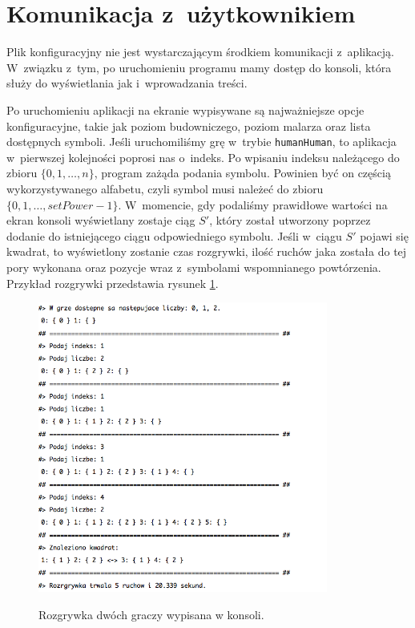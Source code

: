 \documentclass[document]{xmgr}
\begin{document}
\section{Komunikacja z~użytkownikiem}
Plik konfiguracyjny nie jest wystarczającym środkiem komunikacji z~ap\-likacją. W~związku z~tym, po uruchomieniu programu mamy dostęp do konsoli, która służy do wyświetlania jak i~wprowadzania treści.

Po uruchomieniu aplikacji na ekranie wypisywane są najważniejsze op\-cje konfiguracyjne, takie jak poziom budowniczego, poziom malarza oraz lista dostępnych symboli. Jeśli uruchomiliśmy grę w~trybie \texttt{humanHuman}, to aplikacja w~pierwszej kolejności poprosi nas o~indeks. Po wpisaniu indeksu należącego do zbioru \mbox{$\{0, 1, \ldots,n\}$}, program zażąda podania symbolu. Powinien być on częścią wykorzystywanego alfabetu, czyli symbol musi należeć do zbioru \mbox{$\{0, 1, \ldots, setPower-1\}$}. W~momencie, gdy podaliśmy prawidłowe wartości na ekran konsoli wyświetlany zostaje ciąg $S'$, który został utworzony poprzez dodanie do istniejącego ciągu odpowiedniego symbolu. Jeśli w~ciągu $S'$ pojawi się kwadrat, to wyświetlony zostanie czas rozgrywki, ilość ruchów jaka została do tej pory wykonana oraz pozycje wraz z~symbolami wspomnianego powtórzenia. Przykład rozgrywki przedstawia rysunek \ref{fig:rozgrywka}.



\begin{figure}[tbh]
    \centering
    \caption{Rozgrywka dwóch graczy wypisana w konsoli.}
    \includegraphics[width = 0.85\textwidth]{images2/rozgrywka1}
    \label{fig:rozgrywka}
\end{figure}
\end{document}
